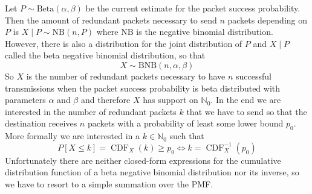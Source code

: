 \documentclass[10pt,a4paper]{article}
\DeclareMathOperator{\cdf}{CDF}
\begin{document}
Let $P \sim \mathrm{Beta}(\alpha, \beta)$ be the current estimate for the packet success probability.
Then the amount of redundant packets necessary to send $n$ packets depending on $P$ is $X \mid P \sim \mathrm{NB}(n, P)$ where $\mathrm{NB}$ is the negative binomial distribution.
However, there is also a distribution for the joint distribution of $P$ and $X \mid P$ called the beta negative binomial distribution, so that
\begin{equation*}
  X \sim \mathrm{BNB}(n, \alpha, \beta)
\end{equation*}
So $X$ is the number of redundant packets necessary to have $n$ successful transmissions when the packet success probability is beta distributed with parameters $\alpha$ and $\beta$ and therefore $X$ has support on $\mathbb{N}_{0}$.
In the end we are interested in the number of redundant packets $k$ that we have to send so that the destination receives $n$ packets with a probability of least some lower bound $p_{0}$.
More formally we are interested in a $k \in \mathbb{N}_{0}$ such that
\begin{equation*}
  P[X \le k] = \cdf_{X}(k) \ge p_{0} \Leftrightarrow k = \cdf_{X}^{-1}(p_{0})
\end{equation*}
Unfortunately there are neither closed-form expressions for the cumulative distribution function of a beta negative binomial distribution nor its inverse, so we have to resort to a simple summation over the PMF.
\end{document}
